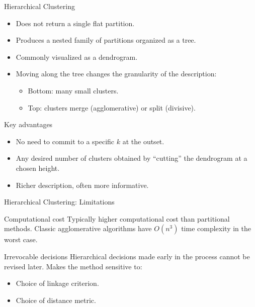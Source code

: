 \begin{frame}{Hierarchical Clustering}
  \begin{itemize}
    \item Does not return a single flat partition.
    \item Produces a \alert{nested family of partitions} organized as a tree.
    \item Commonly visualized as a \alert{dendrogram}.
    \item Moving along the tree changes the granularity of the description:
      \begin{itemize}
        \item Bottom: many small clusters.
        \item Top: clusters merge (agglomerative) or split (divisive).
      \end{itemize}
  \end{itemize}
  \begin{block}{Key advantages}
    \begin{itemize}
      \item No need to commit to a specific $k$ at the outset.
      \item Any desired number of clusters obtained by ``cutting'' the dendrogram at a chosen height.
      \item Richer description, often more informative.
    \end{itemize}
  \end{block}
\end{frame}

\begin{frame}{Hierarchical Clustering: Limitations}
  \begin{alertblock}{Computational cost}
    Typically higher computational cost than partitional methods. Classic agglomerative
    algorithms have $O(n^3)$ time complexity in the worst case.
  \end{alertblock}
  \vspace{0.4em}
  \begin{alertblock}{Irrevocable decisions}
    Hierarchical decisions made early in the process \alert{cannot be revised later}.
    Makes the method sensitive to:
    \begin{itemize}
      \item Choice of linkage criterion.
      \item Choice of distance metric.
    \end{itemize}
  \end{alertblock}
\end{frame}

